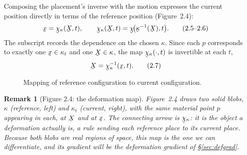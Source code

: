 \documentclass[17pt,a4paper]{extreport}
\DeclareRobustCommand{\vek}[1]{\underaccent{\tilde}{#1}}
\newcommand{\blob}[1]{\draw[#1] plot[smooth cycle,tension=0.85] coordinates
  {(0,1.05) (1.15,0.72) (1.5,-0.35) (0.6,-1.15) (-0.75,-0.95) (-1.3,0.05)};}
\newcommand{\bx}{\vek{x}}
\newcommand{\bX}{\vek{X}}
\newcommand{\bchi}{\vek{\chi}}
\newcommand{\bkappa}{\vek{\kappa}}
\theoremstyle{scplain}
\theoremstyle{scdefn}
\newtheorem{remark}[theorem]{Remark}
\begin{document}
Composing the placement's inverse with the motion expresses the current
position directly in terms of the reference position (Figure~2.4):
\begin{equation}
   \bx=\bchi_\kappa(\bX,t),\qquad
   \bchi_\kappa(\bX,t)=\bchi\!\big(\bkappa^{-1}(\bX),t\big). \tag{2.5--2.6}\label{eq:2.5}
\end{equation}
The subscript records the dependence on the chosen $\kappa$. Since each
$p$ corresponds to exactly one $\bx\in\kappa_t$ and one $\bX\in\kappa$, the
map $\bchi_\kappa(\cdot,t)$ is invertible at each $t$,
\begin{equation}
   \bX=\bchi_\kappa^{-1}(\bx,t). \tag{2.7}\label{eq:2.7}
\end{equation}

\begin{figure}[htbp]\centering
{}
\caption{Mapping of reference configuration to current configuration.}\label{fig:2.4}
\end{figure}

\begin{remark}[Figure 2.4: the deformation map]\label{rem:fig4}
Figure~2.4 draws two \emph{solid} blobs, $\kappa$ (reference, left) and
$\kappa_t$ (current, right), with the same material point $p$ appearing in
each, at $\bX$ and at $\bx$. The connecting arrow is $\bchi_\kappa$: it is
the object a deformation actually is, a rule sending each reference place to
its current place. Because both blobs are real regions of space, this map is
the one we can differentiate, and its gradient will be the deformation
gradient of \S\ref{sec:defgrad}.
\end{remark}
\end{document}
